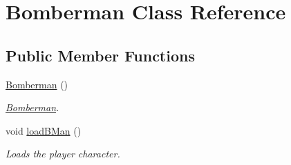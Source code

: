 \hypertarget{classBomberman}{\section{Bomberman Class Reference}
\label{classBomberman}
}
\subsection*{Public Member Functions}
\begin{DoxyCompactItemize}
\item 
\hypertarget{classBomberman_adeb46eff1b0f84642c6f692e307e8e92}{\hyperlink{classBomberman_adeb46eff1b0f84642c6f692e307e8e92}{Bomberman} ()}\label{classBomberman_adeb46eff1b0f84642c6f692e307e8e92}

\begin{DoxyCompactList}\small\item\em \hyperlink{classBomberman}{Bomberman}. \end{DoxyCompactList}\item 
\hypertarget{classBomberman_a96088c0ee9c203a4cda464fdca3a81cb}{void \hyperlink{classBomberman_a96088c0ee9c203a4cda464fdca3a81cb}{load\-B\-Man} ()}\label{classBomberman_a96088c0ee9c203a4cda464fdca3a81cb}

\begin{DoxyCompactList}\small\item\em Loads the player character. \end{DoxyCompactList}\end{DoxyCompactItemize}
